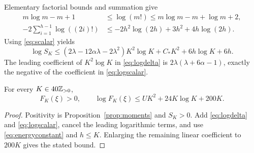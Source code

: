 Elementary factorial bounds and summation give
\begin{align*}
 m\log m-m+1&\le\log(m!)\le m\log m-m+\log m+2,\\
 -2\sum_{i=1}^{h-1}\log((2i)!)
 &\le-2h^2\log(2h)+3h^2+4h\log(2h).
\end{align*}
Using \eqref{eq:scalar} yields
\begin{equation}\label{eq:logscalar}
 \log S_K\le(2\lambda-12\alpha\lambda-2\lambda^2)K^2\log K
                +C_*K^2+6h\log K+6h.
\end{equation}
The leading coefficient of $K^2\log K$ in \eqref{eq:logdelta} is
$2\lambda(\lambda+6\alpha-1)$, exactly the negative of the coefficient
in \eqref{eq:logscalar}.

\begin{proposition}
\label{prop:realbound}
For every $K\in40\mathbb Z_{>0}$,
\begin{equation}\label{eq:realbound}
 F_K(\xi)>0,\qquad
 \log F_K(\xi)\le UK^2+24K\log K+200K.
\end{equation}
\end{proposition}
\begin{proof}
Positivity is Proposition~\ref{prop:moments} and $S_K>0$. Add
\eqref{eq:logdelta} and \eqref{eq:logscalar}, cancel the leading
logarithmic terms, and use \eqref{eq:energyconstant} and $h\le K$.
Enlarging the remaining linear coefficient to $200K$ gives the stated
bound.
\end{proof}


